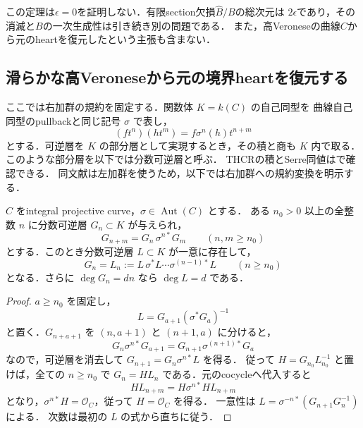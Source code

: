 \documentclass[11pt,a4paper]{ltjsarticle}
\begin{document}
\begin{remark}[なお残る障害]
この定理は$\epsilon=0$を証明しない．有限section欠損$\widehat B/B$の総次元は
$2\epsilon$であり，その消滅と$B$の一次生成性は引き続き別の問題である．
また，高Veroneseの曲線$C$から元のheartを復元したという主張も含まない．
\end{remark}


\subsection{滑らかな高Veroneseから元の境界heartを復元する}

ここでは右加群の規約を固定する．関数体 $K=k(C)$ の自己同型を
曲線自己同型のpullbackと同じ記号 $\sigma$ で表し，
\[
 (f t^n)(h t^m)=f\sigma^n(h)t^{n+m}
\]
とする．可逆層を $K$ の部分層として実現するとき，その積と商も
$K$ 内で取る．このような部分層を以下では分数可逆層と呼ぶ．
THCRの積とSerre同値は\cite[\S2.3, Proposition 2.2, Theorem 2.4]{CKSTHCR}で確認できる．
同文献は左加群を使うため，以下では右加群への規約変換を明示する．

\begin{lemma}[余有限な可逆層cocycleの一次延長]
\label{lem:v10-cofinite-line-cocycle}
$C$ をintegral projective curve，$\sigma\in\operatorname{Aut}(C)$ とする．
ある $n_0>0$ 以上の全整数 $n$ に分数可逆層 $G_n\subset K$ が与えられ，
\[
 G_{n+m}=G_n\,\sigma^{n*}G_m\qquad(n,m\ge n_0)
\]
とする．このとき分数可逆層 $L\subset K$ が一意に存在して，
\[
 G_n=L_n:=L\,\sigma^*L\cdots\sigma^{(n-1)*}L
 \qquad(n\ge n_0)
\]
となる．さらに $\deg G_n=dn$ なら $\deg L=d$ である．
\end{lemma}
\begin{proof}
$a\ge n_0$ を固定し，
\[
 L=G_{a+1}(\sigma^*G_a)^{-1}
\]
と置く．$G_{n+a+1}$ を $(n,a+1)$ と $(n+1,a)$ に分けると，
\[
 G_n\sigma^{n*}G_{a+1}
 =G_{n+1}\sigma^{(n+1)*}G_a
\]
なので，可逆層を消去して
$G_{n+1}=G_n\sigma^{n*}L$ を得る．
従って $H=G_{n_0}L_{n_0}^{-1}$ と置けば，全ての $n\ge n_0$ で
$G_n=HL_n$ である．元のcocycleへ代入すると
\[
 H L_{n+m}=H\sigma^{n*}H L_{n+m}
\]
となり，$\sigma^{n*}H=\mathcal O_C$，従って $H=\mathcal O_C$ を得る．
一意性は $L=\sigma^{-n*}(G_{n+1}G_n^{-1})$ による．
次数は最初の $L$ の式から直ちに従う．
\end{proof}
\end{document}
